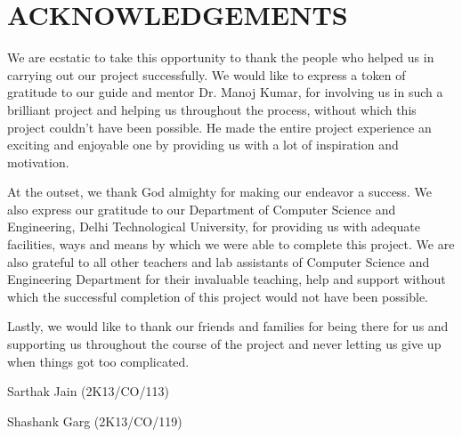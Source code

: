 \chapter*{ACKNOWLEDGEMENTS}


We are ecstatic to take this opportunity to thank  the people who helped us in carrying out our project successfully. We would like to express a token of gratitude to our guide and mentor Dr. Manoj Kumar, for  involving us in such a  brilliant  project  and  helping  us  throughout  the  process,  without which this project couldn't have been possible. He made the entire project  experience an  exciting and enjoyable one by providing us with a lot of inspiration and motivation.
\par
At the outset, we thank God almighty for making our endeavor a success. We also express our gratitude to  our Department  of  Computer  Science  and  Engineering,  Delhi  Technological  University,  for providing us with adequate facilities, ways and means by which we were able to complete this project. We  are  also  grateful  to  all  other  teachers  and  lab  assistants  of  Computer  Science  and  Engineering Department for their invaluable teaching, help and support without which the successful completion of this project would not have been possible.
\par
Lastly,  we  would  like  to  thank  our  friends  and  families  for  being  there  for  us  and  supporting  us throughout the course of the project and never letting us give up when things got too complicated. 

\begin{flushright} Sarthak Jain (2K13/CO/113) \end{flushright}
\begin{flushright} Shashank Garg (2K13/CO/119) \end{flushright}

